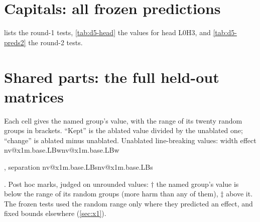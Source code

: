 \documentclass[11pt]{article}
\makeatletter
\newcommand{\nv}[1]{\ifcsname nv@#1\endcsname\csname nv@#1\endcsname\else\PackageError{numbers}{Unknown number key #1}{}\fi}
\newcommand{\hd}[2]{L#1H#2}
\makeatother
\begin{document}










\section{Capitals: all frozen predictions}
\label{app:caps}

 lists the round-1 tests, \cref{tab:d5-head} the values for head \hd{0}{3}, and \cref{tab:d5-preds2} the round-2 tests.





\section{Shared parts: the full held-out matrices}
\label{app:x1}

Each cell gives the named group's value, with the range of its twenty random groups in brackets. ``Kept'' is the ablated value divided by the unablated one; ``change'' is ablated minus unablated. Unablated line-breaking values: width effect \nv{x1m.base.LBw}, separation \nv{x1m.base.LBs}. Post hoc marks, judged on unrounded values: $\dagger$ the named group's value is below the range of its random groups (more harm than any of them), $\ddagger$ above it. The frozen tests used the random range only where they predicted an effect, and fixed bounds elsewhere (\cref{sec:x1}).





\end{document}
